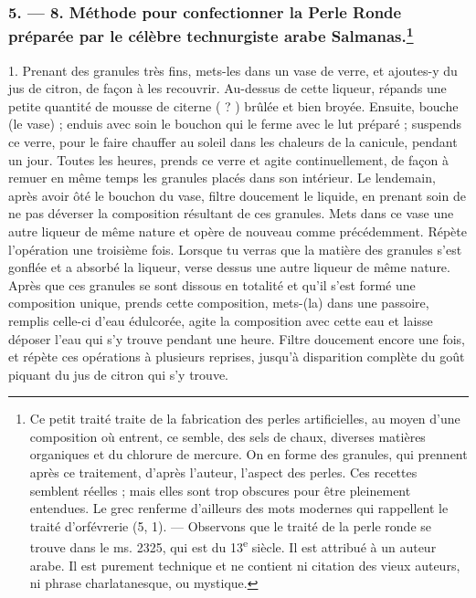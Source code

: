 \documentclass[a4paper, 11pt, oneside, polutonikogreek, french]{article}
\begin{document}
\subsubsection[5. --- 8. Méthode pour confectionner la Perle Ronde préparée par le célèbre technurgiste arabe Salmanas.]{5. --- 8. Méthode pour confectionner la Perle Ronde préparée par le célèbre technurgiste arabe Salmanas.\footnote{Ce petit traité traite de la fabrication des perles artificielles, au moyen d'une composition où entrent, ce semble, des sels de chaux, diverses matières organiques et du chlorure de mercure. On en forme des granules, qui prennent après ce traitement, d'après l'auteur, l'aspect des perles. Ces recettes semblent réelles ; mais elles sont trop obscures pour être pleinement entendues. Le grec renferme d'ailleurs des mots modernes qui rappellent le traité d'orfévrerie (5, 1). --- Observons que le traité de la perle ronde se trouve dans le ms. 2325, qui est du 13\textsuperscript{e} siècle. Il est attribué à un auteur arabe. Il est purement technique et ne contient ni citation des vieux auteurs, ni phrase charlatanesque, ou mystique.}}

1. Prenant des granules très fins, mets-les dans un vase de verre, et ajoutes-y du jus de citron, de façon à les recouvrir. Au-dessus de cette liqueur, répands une petite quantité de mousse de citerne ( ? ) brûlée et bien broyée. Ensuite, bouche (le vase) ; enduis avec soin le bouchon qui le ferme avec le lut préparé ; suspends ce verre, pour le faire chauffer au soleil dans les chaleurs de la canicule, pendant un jour. Toutes les heures, prends ce verre et agite continuellement, de façon à remuer en même temps les granules placés dans son intérieur. Le lendemain, après avoir ôté le bouchon du vase, filtre doucement le liquide, en prenant soin de ne pas déverser la composition résultant de ces granules. Mets dans ce vase une autre liqueur de même nature et opère de nouveau comme précédemment. Répète l'opération une troisième fois. Lorsque tu verras que la matière des granules s'est gonflée et a absorbé la liqueur, verse dessus une autre liqueur de même nature. Après que ces granules se sont dissous en totalité et qu'il s'est formé une composition unique, prends cette composition, mets-(la) dans une passoire, remplis celle-ci d'eau édulcorée, agite la composition avec cette eau et laisse déposer l'eau qui s'y trouve pendant une heure. Filtre doucement encore une fois, et répète ces opérations à plusieurs reprises, jusqu'à disparition complète du goût piquant du jus de citron qui s'y trouve.
\end{document}
